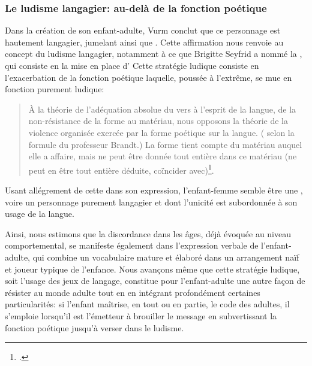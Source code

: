 \subsubsection{Le ludisme langagier: au-delà de la fonction poétique}
Dans la création de son enfant-adulte, Vurm conclut que ce personnage est hautement langagier, jumelant  ainsi que .
Cette affirmation nous renvoie au concept du ludisme langagier, notamment à ce que Brigitte Seyfrid a nommé la , qui consiste en la mise en place d'
Cette stratégie ludique consiste en l'exacerbation de la fonction poétique laquelle, poussée à l'extrême, se mue en fonction purement ludique:
\begin{quote}
  \begin{singlespace}
    \small
    À la théorie de l'adéquation absolue du vers à l'esprit de la langue, de la non-résistance de la forme au matériau, nous opposons la théorie de la violence organisée exercée par la forme poétique sur la langue. ( selon la formule du professeur Brandt.) La forme tient compte du matériau auquel elle a affaire, mais ne peut être donnée tout entière dans ce matériau (ne peut en être tout entière déduite, coïncider avec)\footcite[40]{Jakobson1973}.
    \normalsize
  \end{singlespace}
\end{quote}
Usant allégrement de cette  dans son expression, l'enfant-femme semble être une , voire un personnage purement langagier et dont l'unicité est subordonnée à son usage de la langue.
\par
Ainsi, nous estimons que la discordance dans les âges, déjà évoquée au niveau comportemental, se manifeste également dans l'expression verbale de l'enfant-adulte, qui combine un vocabulaire mature et élaboré dans un arrangement naïf et joueur typique de l'enfance.
Nous avançons même que cette stratégie ludique, soit l'usage des jeux de langage, constitue pour l'enfant-adulte une autre façon de résister au monde adulte tout en en intégrant profondément certaines particularités: si l'enfant maîtrise, en tout ou en partie, le code des adultes, il s'emploie lorsqu'il est l'émetteur à brouiller le message en subvertissant la fonction poétique jusqu'à verser dans le ludisme.

